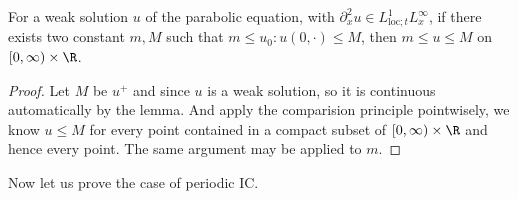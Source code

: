 \begin{lemma}
    For a weak solution $u$ of the parabolic equation, with $\partial_x^2 u \in L^1_{\text{loc};t}L^{\infty}_x$, if there exists two constant $m,M$ such that $m \leq u_0:u(0,\cdot) \leq M$, then $m \leq u \leq M$ on $[0,\infty)\times\R$.
\end{lemma}
\begin{proof}
    Let $M$ be $u^+$ and since $u$ is a weak solution, so it is continuous automatically by the lemma. And apply the comparision principle pointwisely, we know $u \leq M$ for every point contained in a compact subset of $[0,\infty)\times \R$ and hence every point. The same argument may be applied to $m$.
\end{proof}

Now let us prove the case of periodic IC.

